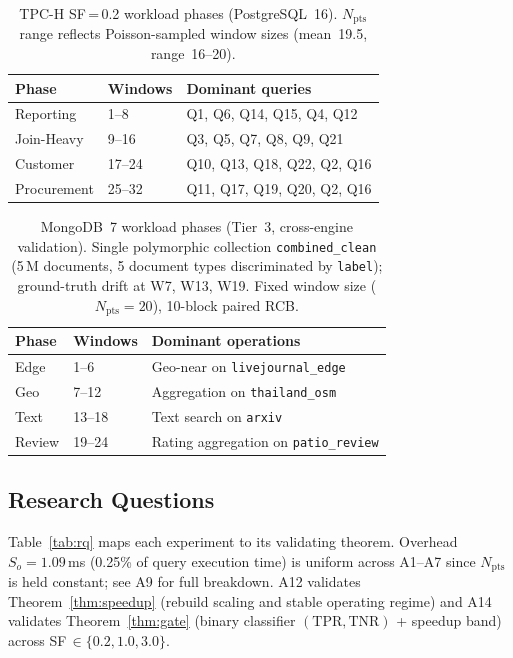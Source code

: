 \documentclass[10pt,twocolumn,a4paper]{article}
\newcommand{\Npts}{N_{\mathrm{pts}}}
\newcommand{\TPR}{\mathrm{TPR}}
\newcommand{\TNR}{\mathrm{TNR}}
\begin{document}
\begin{table}[!htb]\centering\small
\caption{TPC-H SF\,=\,0.2 workload phases (PostgreSQL~16).
$\Npts$ range reflects Poisson-sampled window sizes
(mean~19.5, range~16--20).}\label{tab:phases}
\begin{tabular}{@{}llp{3.5cm}@{}}
\toprule
\textbf{Phase} & \textbf{Windows} & \textbf{Dominant queries}\\
\midrule
Reporting & 1--8 & Q1, Q6, Q14, Q15, Q4, Q12\\
Join-Heavy & 9--16 & Q3, Q5, Q7, Q8, Q9, Q21\\
Customer & 17--24 & Q10, Q13, Q18, Q22, Q2, Q16\\
Procurement & 25--32 & Q11, Q17, Q19, Q20, Q2, Q16\\
\bottomrule
\end{tabular}
\end{table}

\begin{table}[!htb]\centering\small
\caption{MongoDB~7 workload phases (Tier~3, cross-engine validation).
Single polymorphic collection \texttt{combined\_clean} (5\,M documents,
5 document types discriminated by \texttt{label});
ground-truth drift at W7, W13, W19. Fixed window size
($\Npts\!=\!20$), 10-block paired RCB.}\label{tab:mongo-phases}
\begin{tabular}{@{}llp{3.4cm}@{}}
\toprule
\textbf{Phase} & \textbf{Windows} & \textbf{Dominant operations}\\
\midrule
Edge        & 1--6   & Geo-near on \texttt{livejournal\_edge}\\
Geo         & 7--12  & Aggregation on \texttt{thailand\_osm}\\
Text        & 13--18 & Text search on \texttt{arxiv}\\
Review      & 19--24 & Rating aggregation on \texttt{patio\_review}\\
\bottomrule
\end{tabular}
\end{table}

\subsection{Research Questions}

Table~\ref{tab:rq} maps each experiment to its validating theorem.
Overhead $S_o\!=\!1.09$\,ms (0.25\% of query execution time) is
uniform across A1--A7 since $\Npts$ is held constant; see A9 for
full breakdown. A12 validates Theorem~\ref{thm:speedup} (rebuild scaling and stable
operating regime) and A14 validates Theorem~\ref{thm:gate} (binary
classifier $(\TPR,\TNR)$ + speedup band) across
SF$\,\in\{0.2,1.0,3.0\}$.
\end{document}
